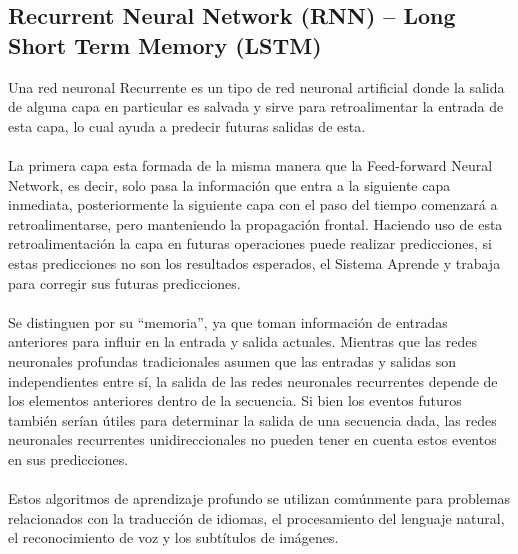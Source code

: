 \documentclass[12pt, a4paper, titlepage]{report}
\begin{document}
				\subsection{Recurrent Neural Network (RNN) – Long Short Term Memory (LSTM)}
				Una red neuronal \gls{Recurrente} es un tipo de red neuronal artificial donde la salida de alguna capa en particular es salvada y sirve para retroalimentar la entrada de esta capa, lo cual ayuda a predecir futuras salidas de esta.\\\\
				La primera capa esta formada de la misma manera que la Feed-forward Neural Network, es decir, solo pasa la información que entra a la siguiente capa inmediata, posteriormente la siguiente capa con el paso del tiempo comenzará a retroalimentarse, pero manteniendo la propagación frontal. Haciendo uso de esta retroalimentación la capa en futuras operaciones puede realizar predicciones, si estas predicciones no son los resultados esperados, el \gls{Sistema} \gls{Aprende} y trabaja para corregir sus futuras predicciones.\cite{refTiposRedesNeu1}\\\\
				Se distinguen por su “memoria”, ya que toman información de entradas anteriores para influir en la entrada y salida actuales. Mientras que las redes neuronales profundas tradicionales asumen que las entradas y salidas son independientes entre sí, la salida de las redes neuronales recurrentes depende de los elementos anteriores dentro de la secuencia. Si bien los eventos futuros también serían útiles para determinar la salida de una secuencia dada, las redes neuronales recurrentes unidireccionales no pueden tener en cuenta estos eventos en sus predicciones.\cite{refTiposRedesNeu4}\\\\
				Estos algoritmos de aprendizaje profundo se utilizan comúnmente para problemas relacionados con la traducción de idiomas, el procesamiento del lenguaje natural, el reconocimiento de voz y los subtítulos de imágenes.
				\newpage
\end{document}
